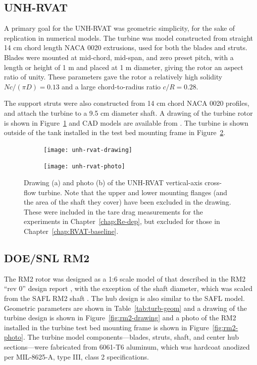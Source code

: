 \subsection{UNH-RVAT}

A primary goal for the UNH-RVAT was geometric simplicity, for the sake of
replication in numerical models. The turbine was model constructed from straight
14 cm chord length NACA 0020 extrusions, used for both the blades and struts.
Blades were mounted at mid-chord, mid-span, and zero preset pitch, with a length
or height of 1 m and placed at 1 m diameter, giving the rotor an aspect ratio of
unity. These parameters gave the rotor a relatively high solidity $Nc/(\pi D) =
0.13$ and a large chord-to-radius ratio $c/R = 0.28$. 

The support struts were also constructed from 14 cm chord NACA 0020 profiles,
and attach the turbine to a 9.5 cm diameter shaft. A drawing of the turbine
rotor is shown in Figure~\ref{fig:rvat-drawing} and CAD models are available
from \cite{Bachant2014-RVAT-CAD}. The turbine is shown outside of the tank
installed in the test bed mounting frame in Figure~\ref{fig:rvat-photo}.

\begin{figure}[ht]
    \centering
    \begin{subfigure}{0.47\textwidth}
        \texttt{[image: unh-rvat-drawing]}
        \caption{}
        \label{fig:rvat-drawing}
    \end{subfigure}
    \begin{subfigure}{0.47\textwidth}
        \texttt{[image: unh-rvat-photo]}
        \caption{}
        \label{fig:rvat-photo}
    \end{subfigure}
    
    \caption{Drawing (a) and photo (b) of the UNH-RVAT vertical-axis cross-flow
        turbine. Note that the upper and lower mounting flanges (and the area of the
        shaft they cover) have been excluded in the drawing. These were included in
        the tare drag measurements for the experiments in Chapter~\ref{chap:Re-dep},
        but excluded for those in Chapter~\ref{chap:RVAT-baseline}.}
    
    \label{fig:unh-rvat}
\end{figure}


\subsection{DOE/SNL RM2}

The RM2 rotor was designed as a 1:6 scale model of that described in the RM2
``rev 0'' design report \cite{Barone2011}, with the exception of the shaft
diameter, which was scaled from the SAFL RM2 shaft \cite{Hill2014}. The hub
design is also similar to the SAFL model. Geometric parameters are shown in
Table~\ref{tab:turb-geom} and a drawing of the turbine design is shown in
Figure~\ref{fig:rm2-drawing} and a photo of the RM2 installed in the turbine
test bed mounting frame is shown in Figure~\ref{fig:rm2-photo}. The turbine
model components---blades, struts, shaft, and center hub sections---were
fabricated from 6061-T6 aluminum, which was hardcoat anodized per MIL-8625-A,
type III, class 2 specifications.

